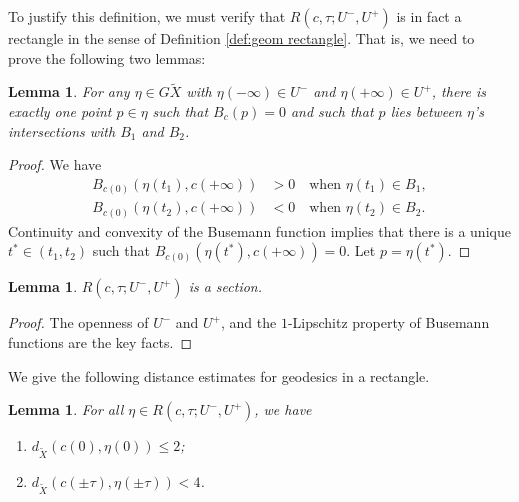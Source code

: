 \documentclass[JEP,XML,SOM,Unicode,NoFloatCountersInSection]{cedram}
\newtheorem{lem}[thm]{Lemma}
\theoremstyle{definition}
\numberwithin{equation}{section}
\begin{document}
To justify this definition, we must verify that $R(c, \tau; U^-, U^+)$ is in fact a rectangle in the sense of Definition \ref{def:geom rectangle}. That is, we need to prove the following two lemmas:

\begin{lem} \label{sectionproof}
For any $\eta \in G\tilde X$ with $\eta(-\infty) \in U^-$ and $\eta(+\infty) \in U^+$, there is exactly one point $p \in \eta$ such that $B_{c}(p)=0$ and such that $p$ lies between $\eta$'s intersections with $B_1$ and $B_2$.
\end{lem}

\begin{proof}
We have
\begin{align*}
B_{c(0)}(\eta(t_1),c(+\infty))&>0\quad \text{when }\eta(t_1)\in B_1,\\
B_{c(0)}(\eta(t_2),c(+\infty))&<0\quad \text{when }\eta(t_2)\in B_2. 
\end{align*}
Continuity and convexity of the Busemann function implies that there is a unique $t^*\in (t_1, t_2)$ such that $B_{c(0)}(\eta(t^*),c(+\infty))=0$. Let $p=\eta(t^*)$.
\end{proof}
\begin{lem}
$R(c, \tau; U^-, U^+)$ is a section.
\end{lem}
\begin{proof}
The openness of $U^-$ and $U^+$, and the $1$-Lipschitz property of Busemann functions are the key facts.
\end{proof}

We give the following distance estimates for geodesics in a rectangle.

\begin{lem} \label{l.distance}
For all $\eta \in R(c, \tau; U^-, U^+)$, we have
\begin{enumerate}
\item\label{l.distance1} $d_{\tilde X}(c(0), \eta(0))\leq 2$;
\item\label{l.distance2} $d_{\tilde X}(c( \pm \tau), \eta(\pm \tau))<4$.
\end{enumerate}
\end{lem}
\end{document}

